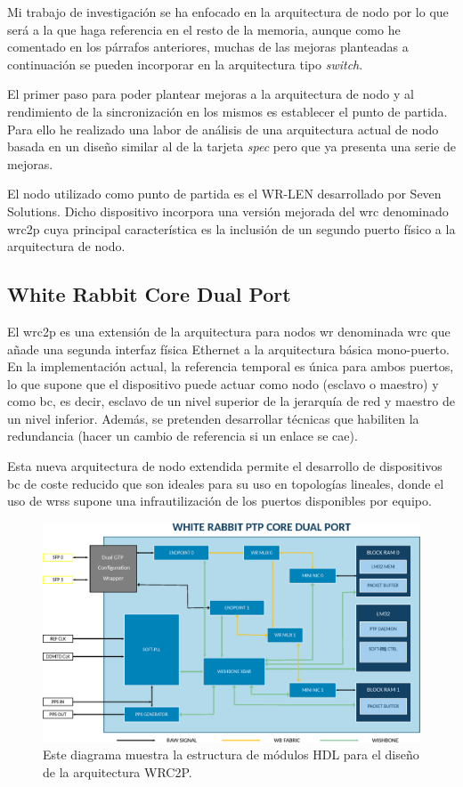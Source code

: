 Mi trabajo de investigación se ha enfocado en la arquitectura de nodo por lo 
que será a la que haga referencia en el resto de la memoria, aunque como he 
comentado en los párrafos anteriores, muchas de las mejoras planteadas a 
continuación se pueden incorporar en la arquitectura tipo \textit{switch}.

El primer paso para poder plantear mejoras a la arquitectura de nodo y al 
rendimiento de la sincronización en los mismos es establecer el punto de 
partida. Para ello he realizado una labor de análisis de una arquitectura 
actual de nodo basada en un diseño similar al de la tarjeta \textit{spec} pero 
que ya presenta una serie de mejoras.

%

El nodo utilizado como punto de partida es el WR-LEN  
desarrollado por Seven Solutions. Dicho dispositivo incorpora una versión 
mejorada del \gls{wrc} denominado \gls{wrc2p} cuya principal característica es 
la inclusión de un segundo puerto físico a la arquitectura de nodo.

\subsection{White Rabbit Core Dual Port}

El \gls{wrc2p} es una extensión de la arquitectura para nodos \gls{wr} 
denominada \acrlong{wrc}  que añade una segunda interfaz física 
Ethernet a la arquitectura básica mono-puerto. En la implementación actual, la 
referencia temporal es única para ambos puertos, lo que supone que el 
dispositivo puede actuar como nodo (esclavo o maestro) y como \gls{bc}, es 
decir, esclavo de un nivel superior de la jerarquía de red y maestro de un 
nivel inferior. Además, se pretenden desarrollar técnicas que habiliten la 
redundancia (hacer un cambio de referencia si un enlace se cae). 

Esta nueva arquitectura de nodo extendida permite el desarrollo de dispositivos 
\gls{bc} de coste reducido que son ideales para su uso en topologías lineales, 
donde el uso de \gls{wrs}s supone una infrautilización de los puertos 
disponibles por equipo.

\begin{figure}
	\centering
	\includegraphics[width=0.7\linewidth]{imagenes/wrpc_dp}
	\caption[Diagrama de bloques del WRC2P]{Este diagrama muestra la estructura 
	de módulos HDL para el diseño de la arquitectura WRC2P.}
	\label{fig:wrpcdp}
\end{figure}



